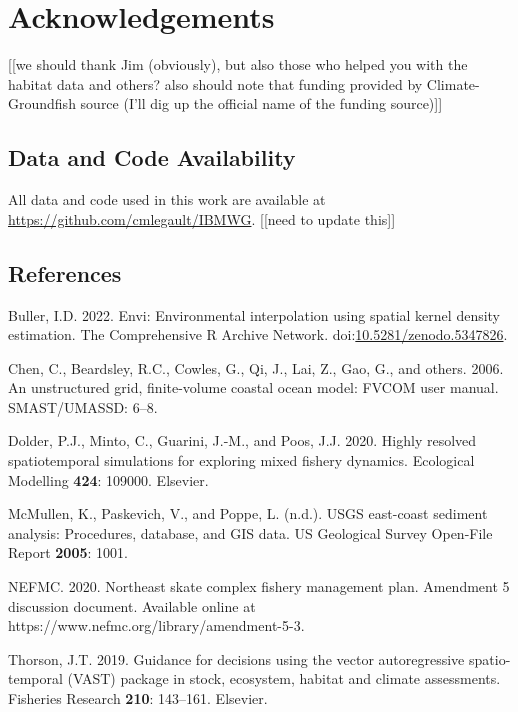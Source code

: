 \documentclass[
  12pt,
]{article}
\newlength{\cslhangindent}
\newlength{\cslentryspacingunit} %
\newenvironment{CSLReferences}[2] %
 {%
  \setlength{\parindent}{0pt}
  \ifodd #1
  \let\oldpar\par
  \def\par{\hangindent=\cslhangindent\oldpar}
  \fi
  \setlength{\parskip}{#2\cslentryspacingunit}
 }%
 {}
\begin{document}
\section{Acknowledgements}

{[}{[}we should thank Jim (obviously), but also those who helped you with the habitat data and others? also should note that funding provided by Climate-Groundfish source (I'll dig up the official name of the funding source){]}{]}

\hypertarget{data-and-code-availability}{%
\subsection{Data and Code Availability}\label{data-and-code-availability}}

All data and code used in this work are available at \url{https://github.com/cmlegault/IBMWG}. {[}{[}need to update this{]}{]}

\hypertarget{references}{%
\subsection{References}\label{references}}

\hypertarget{refs}{}
\begin{CSLReferences}{1}{0}
\leavevmode{}%
Buller, I.D. 2022. Envi: Environmental interpolation using spatial kernel density estimation. The Comprehensive R Archive Network. doi:\href{https://doi.org/10.5281/zenodo.5347826}{10.5281/zenodo.5347826}.

\leavevmode{}%
Chen, C., Beardsley, R.C., Cowles, G., Qi, J., Lai, Z., Gao, G., and others. 2006. An unstructured grid, finite-volume coastal ocean model: FVCOM user manual. SMAST/UMASSD: 6--8.

\leavevmode{}%
Dolder, P.J., Minto, C., Guarini, J.-M., and Poos, J.J. 2020. Highly resolved spatiotemporal simulations for exploring mixed fishery dynamics. Ecological Modelling \textbf{424}: 109000. Elsevier.

\leavevmode{}%
McMullen, K., Paskevich, V., and Poppe, L. (n.d.). USGS east-coast sediment analysis: Procedures, database, and GIS data. US Geological Survey Open-File Report \textbf{2005}: 1001.

\leavevmode{}%
NEFMC. 2020. {Northeast skate complex fishery management plan. Amendment 5 discussion document}. {Available online at https://www.nefmc.org/library/amendment-5-3}.

\leavevmode{}%
Thorson, J.T. 2019. Guidance for decisions using the vector autoregressive spatio-temporal (VAST) package in stock, ecosystem, habitat and climate assessments. Fisheries Research \textbf{210}: 143--161. Elsevier.

\end{CSLReferences}
\end{document}
